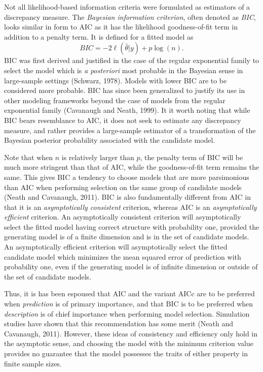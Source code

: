 		Not all likelihood-based information criteria were formulated as estimators of a discrepancy measure. The \textit{Bayesian information criterion}, often denoted as \textit{BIC}, looks similar in
		form to AIC as it has the likelihood goodness-of-fit term in addition to a penalty term. It is defined for a fitted model as
		\begin{equation*}
			BIC = -2 \ell(\hat{\theta}|y) + p \log (n).
		\end{equation*}
		BIC was first derived and justified in the case of the regular exponential family to select the model which is \textit{a posteriori} most probable in the Bayesian sense in
		large-sample settings (Schwarz, 1978). Models with lower BIC are to be considered more probable. BIC has since been generalized to justify its use in other modeling frameworks beyond
		the case of models from the regular exponential family (Cavanaugh and Neath, 1999). It it worth noting that while BIC bears resemblance to AIC, it does not seek to estimate any discrepancy
		measure, and rather provides a large-sample estimator of a transformation of the Bayesian posterior probability associated with the candidate model.

		Note that when $n$ is relatively larger than $p$, the penalty term of BIC will be much more stringent than that of AIC, while the goodness-of-fit term remains the same. This gives BIC a tendency to
		choose models that are more parsimonious than AIC when performing selection on the same group of candidate models (Neath and Cavanaugh, 2011). BIC is also fundamentally different
		from AIC in that it is an \textit{asymptotically consistent} criterion,  whereas AIC is an \textit{asymptotically efficient} criterion. An asymptotically consistent criterion will asymptotically
		select the fitted model having correct structure with probability one, provided the generating model is of a finite dimension and is in the set of candidate models. An asymptotically efficient
		criterion will asymptotically select the fitted candidate model which minimizes the mean squared error of prediction with probability one, even if the generating model is of infinite dimension
		or outside of the set of candidate models.

		Thus, it is has been espoused that AIC and the variant AICc are to be preferred when \textit{prediction} is of primary importance, and that BIC is to be preferred
		when \textit{description} is of chief importance when performing model selection. Simulation studies have shown that this recommendation has some merit (Neath and Cavanaugh, 2011). However, these
		ideas of consistency and efficiency only hold in the asymptotic sense, and choosing the model with the minimum criterion value provides no guarantee that the model possesses the traits of either
		property in finite sample sizes.
		
